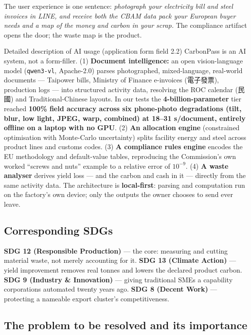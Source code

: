 \documentclass[11pt,a4paper]{article}
\begin{document}
The user experience is one sentence: \emph{photograph your electricity bill and steel invoices in LINE, and receive both the CBAM data pack your European buyer needs and a map of the money and carbon in your scrap.} The compliance artifact opens the door; the waste map is the product.

\begin{formfield}{Detailed description of AI usage (application form field 2.2)}
CarbonPass is an AI system, not a form-filler. (1) \textbf{Document intelligence:} an open vision-language model (\texttt{qwen3-vl}, Apache-2.0) parses photographed, mixed-language, real-world documents --- Taipower bills, Ministry of Finance e-invoices (電子發票), production logs --- into structured activity data, resolving the ROC calendar ({\cjk 民國}) and Traditional-Chinese layouts. In our tests the \textbf{4-billion-parameter} tier reached \textbf{100\% field accuracy across six phone-photo degradations (tilt, blur, low light, JPEG, warp, combined) at 18--31 s/document, entirely offline on a laptop with no GPU}\cite{repo}. (2) \textbf{An allocation engine} (constrained optimisation with Monte-Carlo uncertainty) splits facility energy and steel across product lines and customs codes. (3) \textbf{A compliance rules engine} encodes the EU methodology\cite{ir2547} and default-value tables\cite{ir2621}, reproducing the Commission's own worked ``screws and nuts'' example to a relative error of $10^{-9}$\cite{repo}. (4) \textbf{A waste analyser} derives yield loss --- and the carbon and cash in it --- directly from the same activity data. The architecture is \textbf{local-first}: parsing and computation run on the factory's own device; only the outputs the owner chooses to send ever leave.
\end{formfield}

\subsection{Corresponding SDGs}
\textbf{SDG 12 (Responsible Production)} --- the core: measuring and cutting material waste, not merely accounting for it. \textbf{SDG 13 (Climate Action)} --- yield improvement removes real tonnes and lowers the declared product carbon. \textbf{SDG 9 (Industry \& Innovation)} --- giving traditional SMEs a capability corporations automated twenty years ago. \textbf{SDG 8 (Decent Work)} --- protecting a nameable export cluster's competitiveness.

\subsection{The problem to be resolved and its importance}\label{sec:problem}
\end{document}
